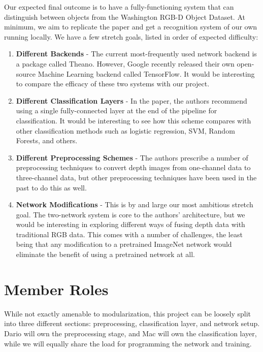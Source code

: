 \documentclass[paper=letter, fontsize=12pt]{article}
\begin{document}
Our expected final outcome is to have a fully-functioning system that can
distinguish between objects from the Washington RGB-D Object Dataset. At
minimum, we aim to replicate the paper and get a recognition system of our own
running locally. We have a few stretch goals, listed in order of expected
difficulty:

\begin{enumerate}

    \item \textbf{Different Backends} - The current most-frequently used
    network backend is a package called Theano. However, Google recently
    released their own open-source Machine Learning backend called
    TensorFlow. It would be interesting to compare the efficacy of these two
    systems with our project.

    \item \textbf{Different Classification Layers} - In the paper, the authors
    recommend using a single fully-connected layer at the end of the pipeline
    for classification. It would be interesting to see how this scheme
    compares with other classification methods such as logistic regression,
    SVM, Random Forests, and others.

    \item \textbf{Different Preprocessing Schemes} - The authors prescribe a
    number of preprocessing techniques to convert depth images from one-channel
    data to three-channel data, but other preprocessing techniques have been 
    used in the past to do this as well. 

    \item \textbf{Network Modifications} - This is by and large our most
    ambitious stretch goal. The two-network system is core to the authors' 
    architecture, but we would be interesting in exploring different ways of 
    fusing depth data with traditional RGB data. This comes with a number of
    challenges, the least being that any modification to a pretrained ImageNet
    network would eliminate the benefit of using a pretrained network at all.

\end{enumerate}


\section{Member Roles}

While not exactly amenable to modularization, this project can be loosely split
into three different sections: preprocessing, classification layer, and network
setup. Dario will own the preprocessing stage, and Mac will own the
classification layer, while we will equally share the load for programming the
network and training.
\end{document}
